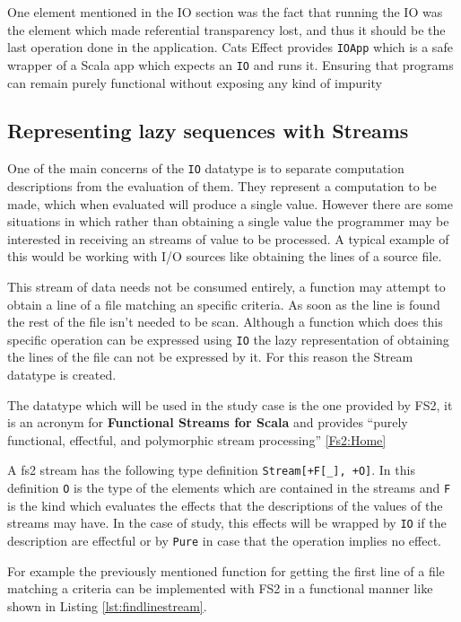 \documentclass[../main.tex]{subfiles}
\begin{document}
One element mentioned in the IO section was the fact that running the IO was the
element which made referential transparency lost, and thus it should be the last
operation done in the application. Cats Effect provides \texttt{IOApp} which is
a safe wrapper of a Scala app which expects an \texttt{IO} and runs it. Ensuring
that programs can remain purely functional without exposing any kind of impurity

\subsection{Representing lazy sequences with Streams}
One of the main concerns of the \texttt{IO} datatype is to separate computation
descriptions from the evaluation of them. They represent a computation to be
made, which when evaluated will produce a single value. However there are some
situations in which rather than obtaining a single value the programmer may be
interested in receiving an streams of value to be processed. A typical example
of this would be working with I/O sources like obtaining the lines of a source
file.

This stream of data needs not be consumed entirely, a function may attempt to
obtain a line of a file matching an specific criteria. As soon as the line is
found the rest of the file isn't needed to be scan. Although a function which does
this specific operation can be expressed using \texttt{IO} the lazy
representation of obtaining the lines of the file can not be expressed by it. For this
reason the Stream datatype is created.

The datatype which will be used in the study case is the one provided by FS2, it
is an acronym for \textbf{Functional Streams for Scala} and provides ``purely
functional, effectful, and polymorphic stream processing'' \ref{Fs2:Home}

A fs2 stream has the following type definition \texttt{Stream[+F[\_], +O]}. In
this definition \texttt{O} is the type of the elements which are contained in
the streams and \texttt{F} is the kind which evaluates the effects that the
descriptions of the values of the streams may have. In the case of study, this
effects will be wrapped by \texttt{IO} if the description are effectful or by
\texttt{Pure} in case that the operation implies no effect.

For example the previously mentioned function for getting the first line of a
file matching a criteria can be implemented with FS2 in a functional manner like
shown in Listing \ref{lst:findlinestream}.
\end{document}
